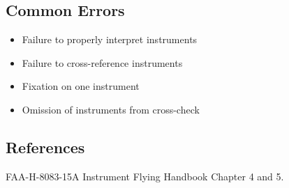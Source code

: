 \subsection{Common Errors}

\begin{itemize}
  \item Failure to properly interpret instruments
  \item Failure to cross-reference instruments
  \item Fixation on one instrument
  \item Omission of instruments from cross-check
\end{itemize}

\subsection{References}

FAA-H-8083-15A Instrument Flying Handbook Chapter 4 and 5.
